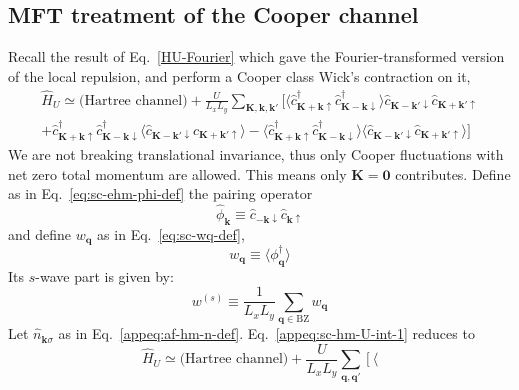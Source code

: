 \subsection{MFT treatment of the Cooper channel}\label{appsubsec:sc-cooper-channel}

{\color{tabred}Recall the result of Eq.~\eqref{HU-Fourier} which gave the Fourier-transformed version of the local repulsion, and perform a Cooper class Wick's contraction on it,
\begin{multline}
	\hat H_U \simeq \text{(Hartree channel)} + \frac{U}{L_x L_y}
	\sum_{\mathbf{K}, \mathbf{k}, \mathbf{k}'} \Big[
		\big\langle
			\hat c_{\mathbf{K}+\mathbf{k} \uparrow}^\dagger \hat c_{\mathbf{K}-\mathbf{k} \downarrow}^\dagger
		\big\rangle \hat c_{\mathbf{K}-\mathbf{k}' \downarrow} \hat c_{\mathbf{K}+\mathbf{k}' \uparrow} \\
		+ \hat c_{\mathbf{K}+\mathbf{k} \uparrow}^\dagger \hat c_{\mathbf{K}-\mathbf{k} \downarrow}^\dagger \big\langle
			\hat c_{\mathbf{K}-\mathbf{k}' \downarrow} \hat c_{\mathbf{K}+\mathbf{k}' \uparrow} 
		\big\rangle - \big\langle
			\hat c_{\mathbf{K}+\mathbf{k} \uparrow}^\dagger \hat c_{\mathbf{K}-\mathbf{k} \downarrow}^\dagger
		\big\rangle \big\langle 
			\hat c_{\mathbf{K}-\mathbf{k}' \downarrow} \hat c_{\mathbf{K}+\mathbf{k}' \uparrow}
		\big\rangle
	\Big] \label{appeq:sc-hm-U-int-2}
\end{multline}
We are not breaking translational invariance, thus only Cooper fluctuations with net zero total momentum are allowed. This means only $\mathbf{K}=\mathbf{0}$ contributes. Define as in Eq.~\eqref{eq:sc-ehm-phi-def} the pairing operator 
\begin{equation}\label{appeq:sc-hm-phi-def}
	\hat \phi_\mathbf{k} \equiv \hat c_{-\mathbf{k}\downarrow} \hat c_{\mathbf{k} \uparrow}
\end{equation}
and define $w_\mathbf{q}$ as in Eq.~\eqref{eq:sc-wq-def},
\[
	w_\mathbf{q} \equiv \big\langle
		\phi_\mathbf{q}^\dagger
	\big\rangle
\]
Its $s$-wave part is given by:
\begin{equation}\label{appeq:sc-hm-ws-self-consistency}
	w^{(s)} \equiv \frac{1}{L_x L_y} \sum_{\mathbf{q}\in\mathrm{BZ}} w_\mathbf{q}
\end{equation}
Let $\hat n_{\mathbf{k}\sigma}$ as in Eq.~\eqref{appeq:af-hm-n-def}. Eq.~\eqref{appeq:sc-hm-U-int-1} reduces to
\begin{equation}\label{appeq:sc-hm-U-int-3}
	\hat H_U \simeq \text{(Hartree channel)} + \frac{U}{L_x L_y} \sum_{\mathbf{q},\mathbf{q}'} \left[
		\big\langle

\end{equation}}
